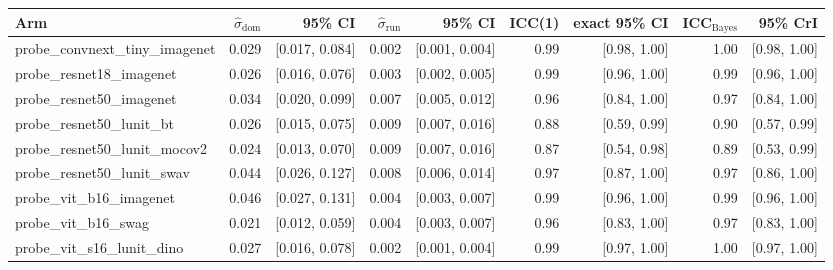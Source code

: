 \begin{tabular}{lrrrrrrrr}
\toprule
Arm & $\hat\sigma_\text{dom}$ & 95\% CI & $\hat\sigma_\text{run}$ & 95\% CI & ICC(1) & exact 95\% CI & ICC$_\text{Bayes}$ & 95\% CrI \\
\midrule
probe\_convnext\_tiny\_imagenet & 0.029 & [0.017, 0.084] & 0.002 & [0.001, 0.004] & 0.99 & [0.98, 1.00] & 1.00 & [0.98, 1.00] \\
probe\_resnet18\_imagenet & 0.026 & [0.016, 0.076] & 0.003 & [0.002, 0.005] & 0.99 & [0.96, 1.00] & 0.99 & [0.96, 1.00] \\
probe\_resnet50\_imagenet & 0.034 & [0.020, 0.099] & 0.007 & [0.005, 0.012] & 0.96 & [0.84, 1.00] & 0.97 & [0.84, 1.00] \\
probe\_resnet50\_lunit\_bt & 0.026 & [0.015, 0.075] & 0.009 & [0.007, 0.016] & 0.88 & [0.59, 0.99] & 0.90 & [0.57, 0.99] \\
probe\_resnet50\_lunit\_mocov2 & 0.024 & [0.013, 0.070] & 0.009 & [0.007, 0.016] & 0.87 & [0.54, 0.98] & 0.89 & [0.53, 0.99] \\
probe\_resnet50\_lunit\_swav & 0.044 & [0.026, 0.127] & 0.008 & [0.006, 0.014] & 0.97 & [0.87, 1.00] & 0.97 & [0.86, 1.00] \\
probe\_vit\_b16\_imagenet & 0.046 & [0.027, 0.131] & 0.004 & [0.003, 0.007] & 0.99 & [0.96, 1.00] & 0.99 & [0.96, 1.00] \\
probe\_vit\_b16\_swag & 0.021 & [0.012, 0.059] & 0.004 & [0.003, 0.007] & 0.96 & [0.83, 1.00] & 0.97 & [0.83, 1.00] \\
probe\_vit\_s16\_lunit\_dino & 0.027 & [0.016, 0.078] & 0.002 & [0.001, 0.004] & 0.99 & [0.97, 1.00] & 1.00 & [0.97, 1.00] \\
\bottomrule
\end{tabular}
